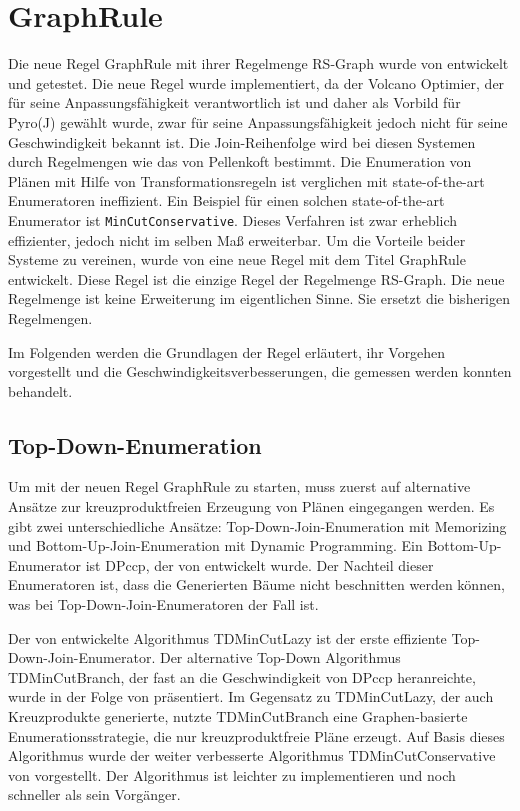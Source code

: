 \section{GraphRule}



Die neue Regel GraphRule mit ihrer Regelmenge RS-Graph wurde von \cite{shanbhag2014optimizing} entwickelt und getestet. Die neue Regel wurde implementiert, da der Volcano Optimier, der für seine Anpassungsfähigkeit verantwortlich ist und daher als Vorbild für Pyro(J) gewählt wurde, zwar für seine Anpassungsfähigkeit jedoch nicht für seine Geschwindigkeit bekannt ist. Die Join-Reihenfolge wird bei diesen Systemen durch Regelmengen wie das von Pellenkoft bestimmt. Die Enumeration von Plänen mit Hilfe von Transformationsregeln ist verglichen mit state-of-the-art Enumeratoren ineffizient. Ein Beispiel für einen solchen state-of-the-art Enumerator ist \texttt{MinCutConservative}. Dieses Verfahren ist zwar erheblich effizienter, jedoch nicht im selben Maß erweiterbar. Um die Vorteile beider Systeme zu vereinen, wurde von \cite{shanbhag2014optimizing} eine neue Regel mit dem Titel GraphRule entwickelt. Diese Regel ist die einzige Regel der Regelmenge RS-Graph. Die neue Regelmenge ist keine Erweiterung im eigentlichen Sinne. Sie ersetzt die bisherigen Regelmengen.

Im Folgenden werden die Grundlagen der Regel erläutert, ihr Vorgehen vorgestellt und die Geschwindigkeitsverbesserungen, die gemessen werden konnten behandelt.

\subsection{Top-Down-Enumeration}

Um mit der neuen Regel GraphRule zu starten, muss zuerst auf alternative Ansätze zur kreuzproduktfreien Erzeugung von Plänen eingegangen werden. Es gibt zwei unterschiedliche Ansätze: Top-Down-Join-Enumeration mit Memorizing und Bottom-Up-Join-Enumeration mit Dynamic Programming. Ein Bottom-Up-Enumerator ist DPccp, der von \cite{moerkotte2006analysis} entwickelt wurde. Der Nachteil dieser Enumeratoren ist, dass die Generierten Bäume nicht beschnitten werden können, was bei Top-Down-Join-Enumeratoren der Fall ist.

Der von \cite{dehaan2007optimal} entwickelte Algorithmus TDMinCutLazy ist der erste effiziente Top-Down-Join-Enumerator. Der alternative Top-Down Algorithmus TDMinCutBranch, der fast an die Geschwindigkeit von DPccp heranreichte, wurde in der Folge von \cite{fender2011new} präsentiert. Im Gegensatz zu TDMinCutLazy, der auch Kreuzprodukte generierte, nutzte TDMinCutBranch eine Graphen-basierte Enumerationsstrategie, die nur kreuzproduktfreie Pläne erzeugt.  Auf Basis dieses Algorithmus wurde der weiter verbesserte Algorithmus TDMinCutConservative von \cite{fender2012effective} vorgestellt. Der Algorithmus ist leichter zu implementieren und noch schneller als sein Vorgänger. 



